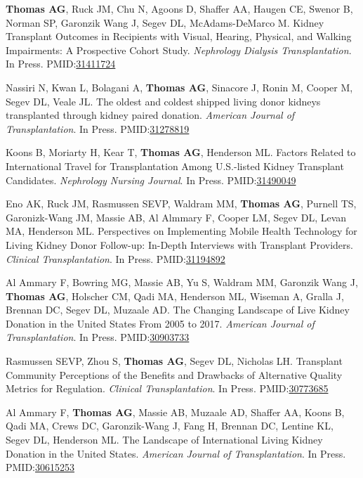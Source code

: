 \documentclass[10pt]{article}
\makeatletter
\newlength{\bibhang}
\newlength{\bibsep}
 {\@listi \global\bibsep\itemsep \global\advance\bibsep by\parsep}
\newenvironment{bibenum*}
  {\renewcommand\labelenumi{[\theenumi]}%
   \etaremune[
     topsep=0pt,
     itemsep=\bibsep,
     parsep=0pt,partopsep=0pt,
     itemindent=-\bibhang,
     leftmargin={\bibhang+\widthof{[999]}}]}
  {\endetaremune}
\newcommand{\pmid}[1]{PMID:\href{https://www.ncbi.nlm.nih.gov/pubmed/#1}{#1}}
\makeatother
\begin{document}
\begin{bibenum*}
\item \textbf{Thomas AG}, Ruck JM, Chu N, Agoons D, Shaffer AA, Haugen CE,
  Swenor B, Norman SP, Garonzik Wang J, Segev DL, McAdams-DeMarco M.
  Kidney Transplant Outcomes in Recipients with Visual, Hearing,
  Physical, and Walking Impairments: A Prospective Cohort Study.
  \emph{Nephrology Dialysis Transplantation}. In Press.
  \pmid{31411724} 

\item Nassiri N, Kwan L, Bolagani A, \textbf{Thomas AG}, Sinacore J, Ronin M,
  Cooper M, Segev DL, Veale JL.
  The oldest and coldest shipped living donor kidneys transplanted
  through kidney paired donation.
  \emph{American Journal of Transplantation}. In Press.
  \pmid{31278819} 

\item Koons B, Moriarty H, Kear T, \textbf{Thomas AG}, Henderson ML.
  Factors Related to International Travel for Transplantation Among U.S.-listed
  Kidney Transplant Candidates.
  \emph{Nephrology Nursing Journal}. In Press.
  \pmid{31490049} %

\item Eno AK, Ruck JM, Rasmussen SEVP, Waldram MM, \textbf{Thomas AG},
  Purnell TS, Garonizk-Wang JM, Massie AB, Al Almmary F, Cooper LM,
  Segev DL, Levan MA, Henderson ML.
  Perspectives on Implementing Mobile Health Technology for Living Kidney
  Donor Follow-up: In-Depth Interviews with Transplant Providers.
  \emph{Clinical Transplantation}. In Press.
  \pmid{31194892} 

\item Al Ammary F, Bowring MG, Massie AB, Yu S, Waldram MM, Garonzik Wang J,
  \textbf{Thomas AG}, Holscher CM, Qadi MA, Henderson ML, Wiseman A,
  Gralla J, Brennan DC, Segev DL, Muzaale AD.
  The Changing Landscape of Live Kidney Donation in the United States
  From 2005 to 2017.
  \emph{American Journal of Transplantation}. In Press.
  \pmid{30903733} 

\item Rasmussen SEVP, Zhou S, \textbf{Thomas AG},
  Segev DL, Nicholas LH.
  Transplant Community Perceptions of the Benefits and Drawbacks of
  Alternative Quality Metrics for Regulation.
  \emph{Clinical Transplantation}. In Press.
  \pmid{30773685} 

\item Al Ammary F\dag, \textbf{Thomas AG\dag}, Massie AB, Muzaale AD,
  Shaffer AA, Koons B, Qadi MA, Crews DC, Garonzik-Wang J,
  Fang H, Brennan DC, Lentine KL, Segev DL, Henderson ML.
  The Landscape of International Living Kidney Donation in the United States.
  \emph{American Journal of Transplantation}. In Press.
  \pmid{30615253} 


\end{bibenum*}
\end{document}
